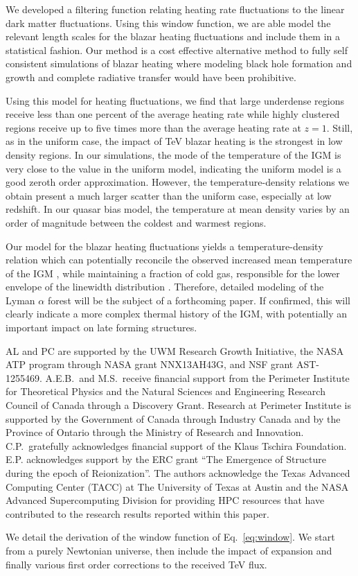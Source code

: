 \documentclass[numberedappendix]{emulateapj}
\begin{document}
We developed a filtering function relating heating rate fluctuations to the linear dark matter fluctuations. Using this window function, we are able model the relevant length scales for the blazar heating fluctuations and include them in a statistical fashion. Our method is a cost effective alternative method to fully self consistent simulations of blazar heating where modeling black hole formation and growth and complete radiative transfer would have been prohibitive.

Using this model for heating fluctuations, we find that large underdense regions receive less than one percent of the average heating rate while highly clustered regions receive up to five times more than the average heating rate at $z=1$. Still, as in the uniform case, the impact of TeV blazar heating is the strongest in low density regions. In our simulations, the mode of the temperature of the IGM is very close to the value in the uniform model, indicating the uniform model is a good zeroth order approximation. However, the temperature-density relations we obtain present a much larger scatter than the uniform case, especially at low redshift. In our quasar bias model, the temperature at mean density varies by an order of magnitude between the coldest and warmest regions.

Our model for the blazar heating fluctuations yields a temperature-density relation which can potentially reconcile the observed increased mean temperature of the IGM \citep{2014MNRAS.441.1916B}, while maintaining a fraction of cold gas, responsible for the lower envelope of the linewidth distribution \citep{2012ApJ...757L..30R}. Therefore, detailed modeling of the Lyman $\alpha$ forest will be the subject of a forthcoming paper. If confirmed, this will clearly indicate a more complex thermal history of the IGM, with potentially an important impact on late forming structures.
\begin{acknowledgements}
AL and PC are supported by the UWM Research Growth Initiative, the NASA ATP
program through NASA grant NNX13AH43G, and NSF grant AST-1255469.
A.E.B.~and M.S.~receive financial support from the Perimeter
Institute for Theoretical Physics and the Natural Sciences and
Engineering Research Council of Canada through a Discovery Grant.
Research at Perimeter Institute is supported by the Government of
Canada through Industry Canada and by the Province of Ontario through
the Ministry of Research and Innovation.
C.P.~gratefully acknowledges
financial support of the Klaus Tschira Foundation. E.P. acknowledges support by the ERC grant ``The Emergence of Structure during the epoch of Reionization''.
The authors acknowledge the Texas Advanced Computing Center (TACC) at The University of Texas at Austin and the NASA Advanced Supercomputing Division for providing HPC resources that have contributed to the research results reported within this paper.
\end{acknowledgements}
\appendix
We detail the derivation of the window function of Eq.~\eqref{eq:window}. We start from a purely Newtonian universe, then include the impact of expansion and finally various first order corrections to the received TeV flux.\\
\end{document}
